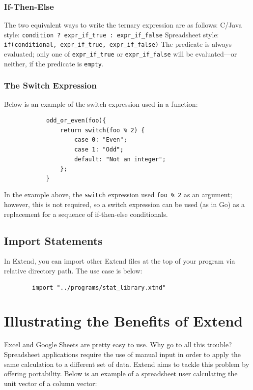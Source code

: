 		\subsubsection{If-Then-Else}
		The two equivalent ways to write the ternary expression are as follows: \newline \newline
		C/Java style: \texttt{condition ? expr\_if\_true : expr\_if\_false} \newline
		Spreadsheet style: \texttt{if(conditional, expr\_if\_true, expr\_if\_false)} \newline \newline
		The predicate is always evaluated; only one of \texttt{expr\_if\_true} or \texttt{expr\_if\_false} will be evaluated---or neither, if the predicate is \texttt{empty}.


		\subsubsection{The Switch Expression}
		Below is an example of the switch expression used in a function:

		\begin{lstlisting}
			odd_or_even(foo){
				return switch(foo % 2) {
					case 0: "Even";
					case 1: "Odd";
					default: "Not an integer";
				};
			}
		\end{lstlisting}

	\medskip \noindent
	In the example above, the \texttt{switch} expression used \texttt{foo \% 2} as an argument; however, this is not required, so a switch expression can be used (as in Go) as a replacement for a sequence of if-then-else conditionals.

	\subsection{Import Statements}
	In Extend, you can import other Extend files at the top of your program via relative directory path. The use case is below:

	\begin{lstlisting}
		import "../programs/stat_library.xtnd"
	\end{lstlisting}

	\section{Illustrating the Benefits of Extend}
	Excel and Google Sheets are pretty easy to use. Why go to all this trouble? Spreadsheet applications require the use of manual input in order to apply the same calculation to a different set of data. Extend aims to tackle this problem by offering portability. Below is an example of a spreadsheet user calculating the unit vector of a column vector:

